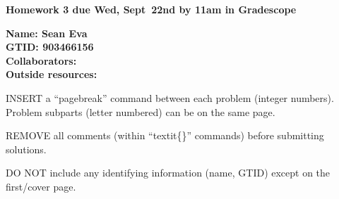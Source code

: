 \documentclass[11pt]{article}
\begin{document}
{\noindent\Large\textbf{Homework 3 due Wed, Sept~22nd by 11am in Gradescope}}

\vspace{.25in}

{\large
\noindent
\textbf{Name: Sean Eva} \smallskip \\
\textbf{GTID: 903466156} \smallskip \\
\textbf{Collaborators:} \smallskip \\
\textbf{Outside resources:} \smallskip
}

\pagebreak 


INSERT a ``pagebreak'' command between each problem (integer numbers).
Problem subparts (letter numbered) can be on the same page.

REMOVE all comments (within ``textit\{\}'' commands) before submitting
solutions.

DO NOT include any identifying information (name, GTID) except on the
first/cover page.
\end{document}
